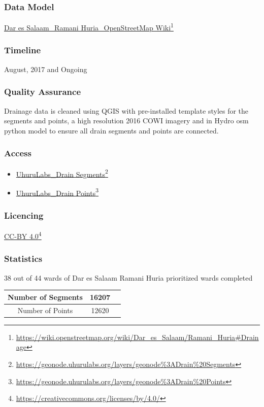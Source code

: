 \documentclass[a4paper,12pt,twoside]{article}
\begin{document}
\subsubsection{Data Model}
\href{https://wiki.openstreetmap.org/wiki/Dar_es_Salaam/Ramani_Huria\#Drainage}{Dar es Salaam\_Ramani Huria\_OpenStreetMap Wiki}\footnote{\url{https://wiki.openstreetmap.org/wiki/Dar_es_Salaam/Ramani_Huria\#Drainage}}

\subsubsection{Timeline}
August, 2017 and Ongoing

\subsubsection{Quality Assurance}

Drainage data is cleaned using QGIS with pre-installed template styles for the segments and points, a high resolution 2016 COWI imagery and in Hydro osm python model to ensure all drain segments and points are connected.

\subsubsection{Access}
\begin{itemize}
    \item \href{https://geonode.uhurulabs.org/layers/geonode\%3ADrain\%20Segments}{UhuruLabs\_Drain Segments}\footnote{\url{https://geonode.uhurulabs.org/layers/geonode\%3ADrain\%20Segments}}
    \item \href{https://geonode.uhurulabs.org/layers/geonode\%3ADrain\%20Points}{UhuruLabs\_Drain Points}\footnote{\url{https://geonode.uhurulabs.org/layers/geonode\%3ADrain\%20Points}}
\end{itemize}

\subsubsection{Licencing}
\href{https://creativecommons.org/licenses/by/4.0/}{CC-BY 4.0}\footnote{\url{https://creativecommons.org/licenses/by/4.0/}}

\subsubsection{Statistics}
38 out of 44 wards of Dar es Salaam Ramani Huria prioritized wards completed
\begin{center}
\begin{tabular}{ |c|c|c| }
 \hline
 Number of Segments & 16207 \\ 
 \hline
 Number of Points & 12620 \\ 
 \hline
\end{tabular}
\end{center}
\end{document}
